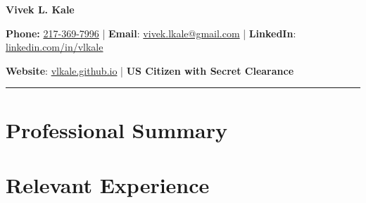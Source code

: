 \documentclass[11pt]{article}
\begin{document}
 

\begin{center}
\selectfont
    \Large \textbf{Vivek L. Kale} \\
    \normalsize

   \textbf{Phone:} \href{tel: +01 217-369-7996}{217-369-7996} | \textbf{Email}: \href{mailto:vivek.lkale@gmail.com}{vivek.lkale@gmail.com} | 
      \textbf{LinkedIn}: \href{http://linkedin.com/in/vlkale}{linkedin.com/in/vlkale} 

     \textbf{Website}: \href{http://vlkale.github.io}{vlkale.github.io} | \textbf{US Citizen with Secret Clearance}
\end{center}
\noindent\rule{\linewidth}{0.4pt}


%

\section*{\selectfont Professional Summary}


\section*{\selectfont Relevant Experience}
 

\end{document}

